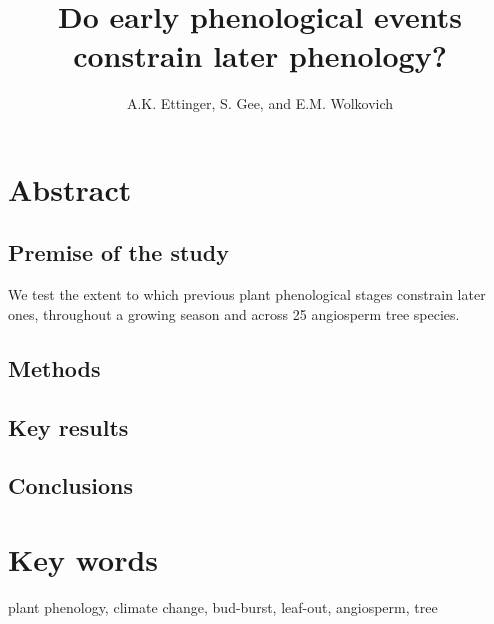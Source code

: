 \documentclass{article}
\begin{document}

\title{Do early phenological events constrain later phenology?} 
\author{A.K. Ettinger, S. Gee, and E.M. Wolkovich}
\maketitle  %


\section*{Abstract}
\subsection*{Premise of the study}
We test the extent to which previous plant phenological stages constrain later ones, throughout a growing season and across 25 angiosperm tree species. 
\subsection*{Methods}
\subsection*{Key results}
\subsection*{Conclusions}
\section* {Key words}
plant phenology, climate change, bud-burst, leaf-out, angiosperm, tree
\end{document}
